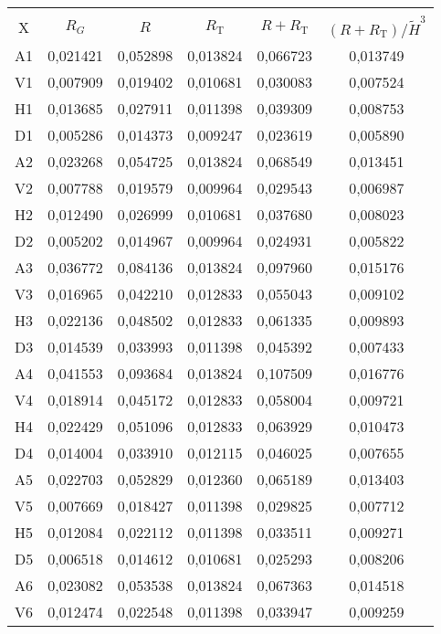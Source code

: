 \begin{multicols}{2}
\begin{table*}[b]
\begin{center}
\tabcolsep=11pt
\begin{tabular}{|c|c|c|c|c|c|}
\hline
&&&&&\\[-9pt]
X & $R_G$ &  $R$ & $R_{\mathrm{T}}$ & $R+R_{\mathrm{T}}$ & 
$(R+R_{\mathrm{T}})/\tilde{H}^3$ \\
\hline
A1 & 0,021421 & 0,052898 & 0,013824 & 0,066723 & 0,013749\\
V1 & 0,007909 & 0,019402 & 0,010681 & 0,030083 & 0,007524\\
H1 & 0,013685 & 0,027911 & 0,011398 & 0,039309 & 0,008753\\
D1 & 0,005286 & 0,014373 & 0,009247 & 0,023619 & 0,005890\\
A2 & 0,023268 & 0,054725 & 0,013824 & 0,068549 & 0,013451\\
V2 & 0,007788 & 0,019579 & 0,009964 & 0,029543 & 0,006987\\
H2 & 0,012490 & 0,026999 & 0,010681 & 0,037680 & 0,008023\\
D2 & 0,005202 & 0,014967 & 0,009964 & 0,024931 & 0,005822\\
A3 & 0,036772 & 0,084136 & 0,013824 & 0,097960 & 0,015176\\
V3 & 0,016965 & 0,042210 & 0,012833 & 0,055043 & 0,009102\\
H3 & 0,022136 & 0,048502 & 0,012833 & 0,061335 & 0,009893\\
D3 & 0,014539 & 0,033993 & 0,011398 & 0,045392 & 0,007433\\
A4 & 0,041553 & 0,093684 & 0,013824 & 0,107509 & 0,016776\\
V4 & 0,018914 & 0,045172 & 0,012833 & 0,058004 & 0,009721\\
H4 & 0,022429 & 0,051096 & 0,012833 & 0,063929 & 0,010473\\
D4 & 0,014004 & 0,033910 & 0,012115 & 0,046025 & 0,007655\\
A5 & 0,022703 & 0,052829 & 0,012360 & 0,065189 & 0,013403\\
V5 & 0,007669 & 0,018427 & 0,011398 & 0,029825 & 0,007712\\
H5 & 0,012084 & 0,022112 & 0,011398 & 0,033511 & 0,009271\\
D5 & 0,006518 & 0,014612 & 0,010681 & 0,025293 & 0,008206\\
A6 & 0,023082 & 0,053538 & 0,013824 & 0,067363 & 0,014518\\
V6 & 0,012474 & 0,022548 & 0,011398 & 0,033947 & 0,009259\\

\end{tabular}
\end{center}
\end{table*}
\end{multicols}

